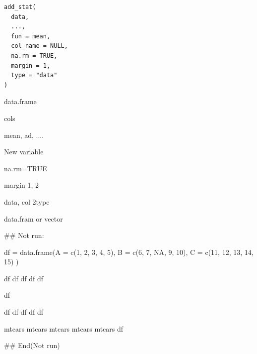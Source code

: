 \documentclass[a4paper]{book}
\begin{document}
%
\begin{Usage}
\begin{verbatim}
add_stat(
  data,
  ...,
  fun = mean,
  col_name = NULL,
  na.rm = TRUE,
  margin = 1,
  type = "data"
)
\end{verbatim}
\end{Usage}
%
\begin{Arguments}
\begin{ldescription}
\item[\code{data}] data.frame

\item[\code{...}] cols

\item[\code{fun}] mean, ad, ....

\item[\code{col\_name}] New variable

\item[\code{na.rm}] na.rm=TRUE

\item[\code{margin}] margin 1, 2

\item[\code{type}] data, col 2type
\end{ldescription}
\end{Arguments}
%
\begin{Value}
data.fram or vector
\end{Value}
%
\begin{Examples}
\begin{ExampleCode}

## Not run: 

df = data.frame(A = c(1, 2, 3, 4, 5), B = c(6, 7, NA, 9, 10), C = c(11, 12, 13, 14, 15) )

df%
df%
df %
df %
df %

df %

df %
df %
df %
df %
df %

mtcars %
mtcars %
mtcars %
mtcars %
mtcars %
df


## End(Not run)


\end{ExampleCode}
\end{Examples}
\end{document}
